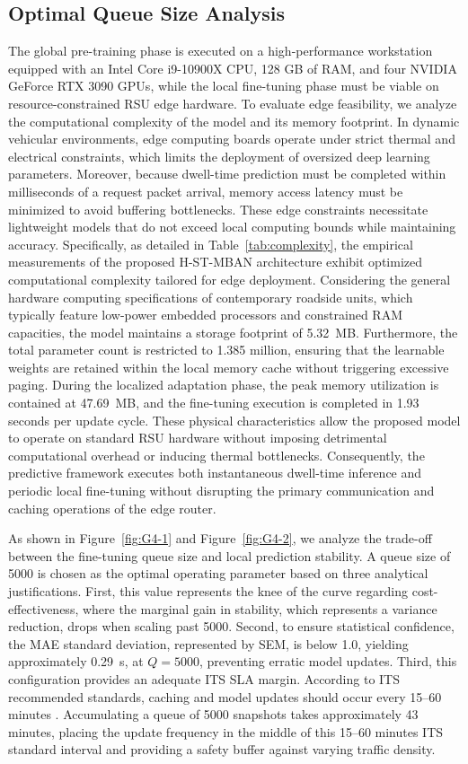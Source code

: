 \documentclass[journal]{IEEEtran}
\begin{document}
\subsection{Optimal Queue Size Analysis}
The global pre-training phase is executed on a high-performance workstation equipped with an Intel Core i9-10900X CPU, 128 GB of RAM, and four NVIDIA GeForce RTX 3090 GPUs, while the local fine-tuning phase must be viable on resource-constrained RSU edge hardware.
To evaluate edge feasibility, we analyze the computational complexity of the model and its memory footprint.
In dynamic vehicular environments, edge computing boards operate under strict thermal and electrical constraints, which limits the deployment of oversized deep learning parameters.
Moreover, because dwell-time prediction must be completed within milliseconds of a request packet arrival, memory access latency must be minimized to avoid buffering bottlenecks.
These edge constraints necessitate lightweight models that do not exceed local computing bounds while maintaining accuracy.
Specifically, as detailed in Table~\ref{tab:complexity}, the empirical measurements of the proposed H-ST-MBAN architecture exhibit optimized computational complexity tailored for edge deployment.
Considering the general hardware computing specifications of contemporary roadside units, which typically feature low-power embedded processors and constrained RAM capacities, the model maintains a storage footprint of 5.32~MB.
Furthermore, the total parameter count is restricted to 1.385 million, ensuring that the learnable weights are retained within the local memory cache without triggering excessive paging.
During the localized adaptation phase, the peak memory utilization is contained at 47.69~MB, and the fine-tuning execution is completed in 1.93 seconds per update cycle.
These physical characteristics allow the proposed model to operate on standard RSU hardware without imposing detrimental computational overhead or inducing thermal bottlenecks.
Consequently, the predictive framework executes both instantaneous dwell-time inference and periodic local fine-tuning without disrupting the primary communication and caching operations of the edge router.

As shown in Figure~\ref{fig:G4-1} and Figure~\ref{fig:G4-2}, we analyze the trade-off between the fine-tuning queue size and local prediction stability. A queue size of 5000 is chosen as the optimal operating parameter based on three analytical justifications. First, this value represents the knee of the curve regarding cost-effectiveness, where the marginal gain in stability, which represents a variance reduction, drops when scaling past 5000. Second, to ensure statistical confidence, the MAE standard deviation, represented by SEM, is below 1.0, yielding approximately 0.29~s, at $Q=5000$, preventing erratic model updates. Third, this configuration provides an adequate ITS SLA margin. According to ITS recommended standards, caching and model updates should occur every 15--60 minutes \cite{office2021}. Accumulating a queue of 5000 snapshots takes approximately 43 minutes, placing the update frequency in the middle of this 15--60 minutes ITS standard interval and providing a safety buffer against varying traffic density.
\end{document}

